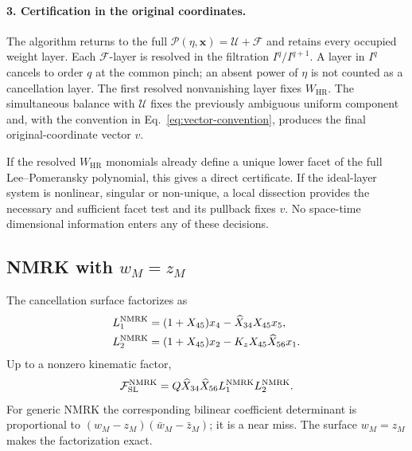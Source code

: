 \documentclass[11pt]{article}
\newcommand{\F}{\mathcal F}
\newcommand{\U}{\mathcal U}
\newcommand{\Pcal}{\mathcal P}
\newcommand{\SL}{\mathrm{SL}}
\newcommand{\HR}{\mathrm{HR}}
\newcommand{\hX}{\widehat X}
\begin{document}
\paragraph{3. Certification in the original coordinates.}
The algorithm returns to the full \(\Pcal(\eta,\mathbf x)=\U+\F\) and retains
every occupied weight layer.  Each \(\F\)-layer is resolved in the filtration
\(I^q/I^{q+1}\).  A layer in \(I^q\) cancels to order \(q\) at the common
pinch; an absent power of \(\eta\) is not counted as a cancellation layer.
The first resolved nonvanishing layer fixes \(W_{\HR}\).  The simultaneous
balance with \(\U\) fixes the previously ambiguous uniform component and,
with the convention in Eq.~\eqref{eq:vector-convention}, produces the final
original-coordinate vector \(v\).

If the resolved \(W_{\HR}\) monomials already define a unique lower facet of
the full Lee--Pomeransky polynomial, this gives a direct certificate.  If the
ideal-layer system is nonlinear, singular or non-unique, a local dissection
provides the necessary and sufficient facet test and its pullback fixes
\(v\).  No space-time dimensional information enters any of these decisions.

\subsection{NMRK with \texorpdfstring{\(w_M=z_M\)}{wM=zM}}

The cancellation surface factorizes as
\begin{align}
 L_1^{\rm NMRK}&=(1+X_{45})x_4-\hX_{34}X_{45}x_5,\nonumber\\
 L_2^{\rm NMRK}&=(1+X_{45})x_2-K_zX_{45}\hX_{56}x_1.
 \label{eq:nmrk-factors}
\end{align}
Up to a nonzero kinematic factor,
\begin{equation}
 \F_{\SL}^{\rm NMRK}=Q\hX_{34}\hX_{56}
 L_1^{\rm NMRK}L_2^{\rm NMRK}.
 \label{eq:nmrk-fsl}
\end{equation}
For generic NMRK the corresponding bilinear coefficient determinant is
proportional to
\((w_M-z_M)(\bar w_M-\bar z_M)\); it is a near miss.  The surface
\(w_M=z_M\) makes the
factorization exact.
\end{document}
